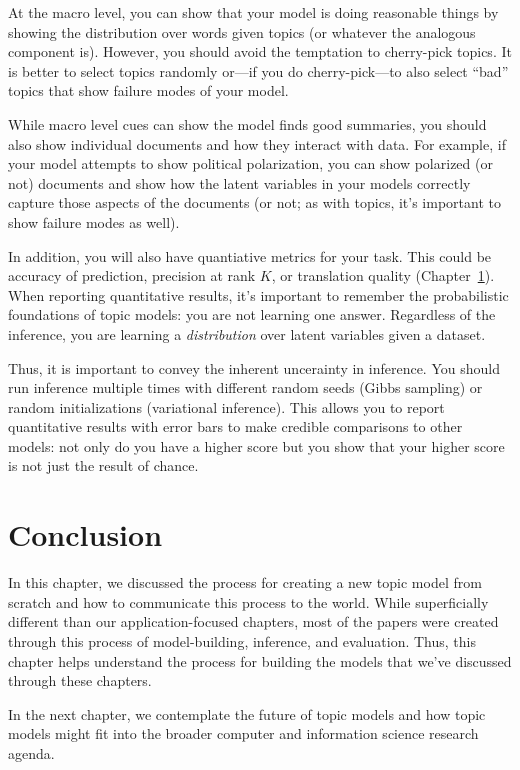 At the macro level, you can show that your model is doing reasonable
things by showing the distribution over words given topics (or
whatever the analogous component is).  However, you should avoid the
temptation to cherry-pick topics.  It is better to select topics
randomly or---if you do cherry-pick---to also select ``bad'' topics
that show failure modes of your model.

While macro level cues can show the model finds good summaries, you
should also show individual documents and how they interact with
data.  For example, if your model attempts to show political
polarization, you can show polarized (or not) documents and show how
the latent variables in your models correctly capture those aspects of
the documents (or not; as with topics, it's important to show failure
modes as well).

In addition, you will also have quantiative metrics for your task.
This could be accuracy of prediction, precision at rank $K$, or
translation quality (Chapter~\ref{}).  When reporting quantitative
results, it's important to remember the probabilistic foundations of
topic models: you are not learning one answer.  Regardless of the
inference, you are learning a \emph{distribution} over latent
variables given a dataset.

Thus, it is important to convey the inherent uncerainty in inference.
You should run inference multiple times with different random seeds
(Gibbs sampling) or random initializations (variational inference).
This allows you to report quantitative results with error bars to make
credible comparisons to other models: not only do you have a higher
score but you show that your higher score is not just the result of
chance.

\section{Conclusion}

In this chapter, we discussed the process for creating a new topic
model from scratch and how to communicate this process to the world.
While superficially different than our application-focused chapters,
most of the papers were created through this process of
model-building, inference, and evaluation.  Thus, this chapter helps
understand the process for building the models that we've discussed
through these chapters.

In the next chapter, we contemplate the future of topic models and how
topic models might fit into the broader computer and information
science research agenda.

